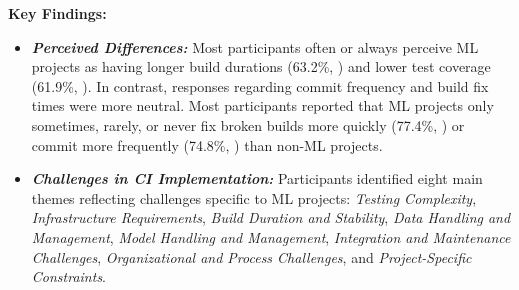 \begin{highlightbox}
\textbf{Key Findings:}
\begin{itemize}
    \item \textit{\textbf{Perceived Differences:}}     
    Most participants often or always perceive ML projects as having longer build durations (63.2\%, ) and lower test coverage (61.9\%, ).
    In contrast, responses regarding commit frequency and build fix times were more neutral. Most participants reported that ML projects only sometimes, rarely, or never fix broken builds more quickly (77.4\%, ) or commit more frequently (74.8\%, ) than non-ML projects.
    
    \item \textit{\textbf{Challenges in CI Implementation:}} Participants identified eight main themes reflecting challenges specific to ML projects:
    \textit{Testing Complexity},
    \textit{Infrastructure Requirements},
    \textit{Build Duration and Stability},
    \textit{Data Handling and Management},
    \textit{Model Handling and Management},
    \textit{Integration and Maintenance Challenges},
    \textit{Organizational and Process Challenges}, and
    \textit{Project-Specific Constraints}.
\end{itemize}
\end{highlightbox}







